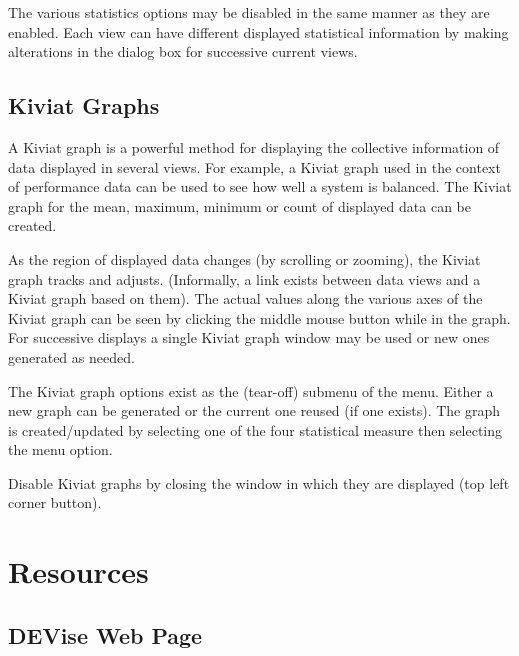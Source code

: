 The various statistics options may be disabled in the same manner as they are
enabled. Each view can have different displayed statistical information by
making alterations in the dialog box for successive current views.


\subsection{Kiviat Graphs}

A Kiviat graph is a powerful method for displaying the collective information of
data displayed in several views. For example, a Kiviat graph used in the context
of performance data can be used to see how well a system is balanced. The Kiviat
graph for the mean, maximum, minimum or count of displayed data can be created.

As the region of displayed data changes (by scrolling or zooming), the Kiviat
graph tracks and adjusts. (Informally, a link exists between data views and a
Kiviat graph based on them). The actual values along the various axes of the
Kiviat graph can be seen by clicking the middle mouse button while in the
graph. For successive displays a single Kiviat graph window may be used or new
ones generated as needed.

The Kiviat graph options exist as the (tear-off)  submenu of
the  menu. Either a new graph can be generated or the current one
reused (if one exists). The graph is created/updated by selecting one of the
four statistical measure then selecting the  menu option.

Disable Kiviat graphs by closing the window in which they are displayed (top
left corner button).


\section{Resources}

\subsection{DEVise Web Page}


